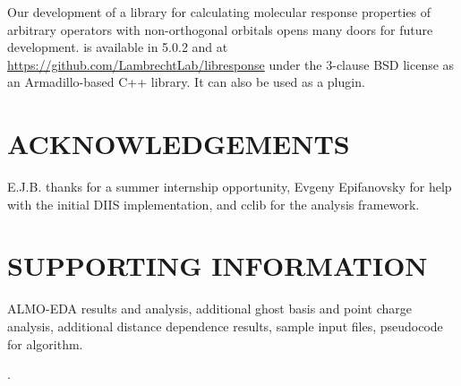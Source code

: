 \documentclass[%
  class = book,%
  crop = false,%
  float = true,%
  multi = true,%
  preview = false,%
]{standalone}
\let\cite\autocite
\newcommand{\caps}[1]{\uppercase{#1}}
\begin{document}
Our development of a library for calculating molecular response properties of arbitrary operators with non-orthogonal orbitals opens many doors for future development. \libresponse{} is available in \qchem{} 5.0.2 and at \url{https://github.com/LambrechtLab/libresponse} under the 3-clause BSD license as an Armadillo-based\cite{armadillo} C++ library. It can also be used as a \psif{}\cite{Psi41.1} plugin.

\section{\texorpdfstring{\caps{Acknowledgements}}{Acknowledgements}}

E.J.B. thanks \qchem{} for a summer internship opportunity, Evgeny Epifanovsky for help with the initial DIIS implementation, and cclib\cite{OBoyle:2008cc,eric_berquist_2016_60670} for the analysis framework.

\section{\texorpdfstring{\caps{Supporting Information}}{Supporting Information}}

ALMO-EDA results and analysis, additional ghost basis and point charge analysis, additional distance dependence results, sample input files, pseudocode for algorithm.

\begin{table}
  \centering
  \caption[ALMO-EDA results for argon\textemdash{}lithium cation dimer]{ALMO-EDA results. Energy units are \si{\kcal\per\mol}. All calculations used Hartree-Fock with a bond length of \SI{2.4297}{\angstrom}.}
  \label{tab:almo-eda-results}
  \IfStandalone{}{}
\end{table}

\begin{table}
  \centering
  \caption{Analysis of ALMO-EDA terms from table~\ref{tab:almo-eda-results}.}.
  \label{tab:almo-eda-results-percentages}
  \IfStandalone{}{}
\end{table}

\begin{table}
  \centering
  \caption[Point charge and ghost function polarizability analysis]{Percentage of supermolecular result for point charge and ghost function polarizabilities. All calculations used Hartree-Fock with canonical MOs and a distance of \SI{2.4297}{\angstrom} from argon to the other center(s).}
  \label{tab:basis-set-dependence-percentages}
  \IfStandalone{}{}
\end{table}
\end{document}
